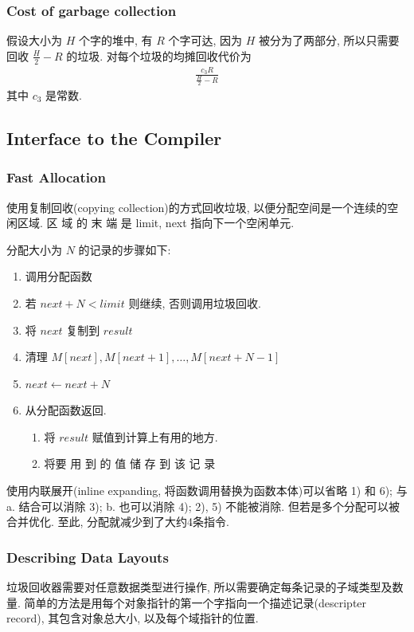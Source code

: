 \subsubsection{Cost of garbage collection}
假设大小为 $H$ 个字的堆中, 有 $R$ 个字可达, 因为 $H$ 被分为了两部分, 所以只需要回收 $\frac{H}{2}-R$ 的垃圾. 对每个垃圾的均摊回收代价为
\begin{align*}
    \frac{c_3R}{\frac{H}{2}-R}
\end{align*}
其中 $c_3$ 是常数. 


\subsection{Interface to the Compiler}
\subsubsection{Fast Allocation}
使用复制回收(copying collection)的方式回收垃圾, 以便分配空间是一个连续的空闲区域. 区 域 的 末 端 是 limit, next 指向下一个空闲单元.


分配大小为 $N$ 的记录的步骤如下: 
\begin{enumerate}
    \item 调用分配函数
    \item 若 $next+N<limit$ 则继续, 否则调用垃圾回收.
    \item 将 $next$ 复制到 $result$
    \item 清理 $M[next], M[next+1],\dots,M[next+N-1]$
    \item $next\leftarrow next+N$
    \item 从分配函数返回. 
    \begin{enumerate}
        \item 将 $result$ 赋值到计算上有用的地方.
        \item 将要 用 到 的 值 储 存 到 该 记 录 
    \end{enumerate}
\end{enumerate}

使用内联展开(inline expanding, 将函数调用替换为函数本体)可以省略 1) 和 6); 与 a. 结合可以消除 3); b. 也可以消除 4); 2), 5) 不能被消除. 但若是多个分配可以被合并优化. 至此, 分配就减少到了大约4条指令. 

\subsubsection{Describing Data Layouts}
垃圾回收器需要对任意数据类型进行操作, 所以需要确定每条记录的子域类型及数量. 简单的方法是用每个对象指针的第一个字指向一个描述记录(descripter record), 其包含对象总大小, 以及每个域指针的位置. 

